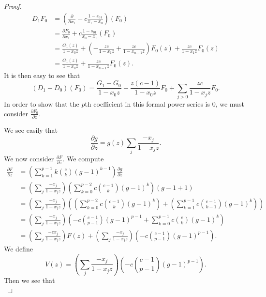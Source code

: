 \documentclass{amsart}
\numberwithin{equation}{section}
\theoremstyle{definition}
\begin{document}
\begin{proof}
\begin{align*}
D_1F_0&=\left(\frac{\partial}{\partial x_1}-c \frac{1-s_{01}}{x_1-x_0}\right)(F_0)\\
&=\frac{\partial F_0}{\partial x_1}+c \frac{1-s_{01}}{x_0-x_1}(F_0)\\
&=\frac{G_1(z)}{1-x_0z}+\left(-\frac{zc}{1-x_1z}+\frac{zc}{1-x_{n-1}z}\right)F_0(z)+\frac{zc}{1-x_1z}F_0(z)\\
&=\frac{G_1(z)}{1-x_0z}+\frac{zc}{1-x_{n-1}z}F_0(z).
\end{align*}
It is then easy to see that 
\[
(D_1-D_0)(F_0)=\frac{G_1-G_0}{1-x_0z}+\frac{z(c-1)}{1-x_0z}F_0+\sum_{j>0} \frac{zc}{1-x_jz}F_0.
\]
In order to show that the $p$th coefficient in this formal power series is $0$, we must consider $\frac{\partial F_0}{\partial z}$. 

We see easily that 
\[
\frac{\partial g}{\partial z} = g(z) \sum_j \frac{-x_j}{1-x_jz}.
\]
We now consider $\frac{\partial F}{\partial z}$. We compute
\begin{align*}
\frac{\partial F}{\partial z}%
&=\left(\sum_{k=1}^{p-1}k\binom{c}{k}(g-1)^{k-1}\right)\frac{\partial g}{\partial z}\\
&=\left(\sum_j \frac{-x_j}{1-x_jz}\right)\left(\sum_{k=0}^{p-2}c\binom{c-1}{k}(g-1)^{k}\right)(g-1+1)\\
&=\left(\sum_j \frac{-x_j}{1-x_jz}\right)\left(\left(\sum_{k=0}^{p-2}c\binom{c-1}{k}(g-1)^{k}\right)+\left(\sum_{k=1}^{p-1}c\binom{c-1}{k-1}(g-1)^{k}\right)\right)\\
&=\left(\sum_j \frac{-x_j}{1-x_jz}\right)\left(-c\binom{c-1}{p-1}(g-1)^{p-1}+\sum_{k=0}^{p-1}c\binom{c}{k}(g-1)^{k}\right)\\
&=\left(\sum_j \frac{-cx_j}{1-x_jz}\right)F(z)+\left(\sum_j \frac{-x_j}{1-x_jz}\right)\left(-c\binom{c-1}{p-1}(g-1)^{p-1}\right).
\end{align*}
We define 
\[
V(z)=\left(\sum_j \frac{-x_j}{1-x_jz}\right)\left(-c\binom{c-1}{p-1}(g-1)^{p-1}\right).
\]
Then we see that 
\[
\]
\end{proof}
\end{document}
